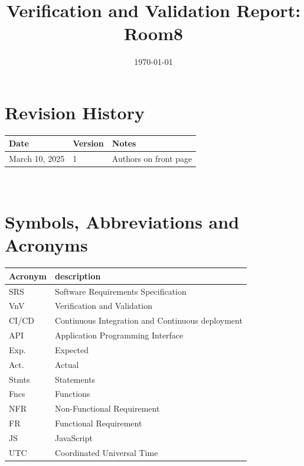 \documentclass[12pt, titlepage]{article}
\begin{document}
\title{Verification and Validation Report: Room8} 
\author{\authname}
\date{\today}
	
\maketitle


\section{Revision History}

\begin{tabularx}{\textwidth}{p{3cm}p{2cm}X}
\toprule {\bf Date} & {\bf Version} & {\bf Notes}\\
\midrule
March 10, 2025 & 1 & Authors on front page\\
\bottomrule
\end{tabularx}

~\newpage

\section{Symbols, Abbreviations and Acronyms}

\renewcommand{\arraystretch}{1.2}
\begin{tabular}{l l} 
  \toprule		
  \textbf{Acronym} & \textbf{description}\\
  \midrule 
  SRS & Software Requirements Specification\\
  VnV & Verification and Validation\\
  CI/CD & Continuous Integration and Continuous deployment\\   
  API & Application Programming Interface\\
  Exp. & Expected\\
  Act. & Actual\\
  Stmts & Statements\\
  Fncs & Functions\\
  NFR & Non-Functional Requirement\\
  FR & Functional Requirement\\
  JS & JavaScript\\
  UTC & Coordinated Universal Time\\
  \bottomrule
\end{tabular}\\


\newpage

\tableofcontents
\end{document}
